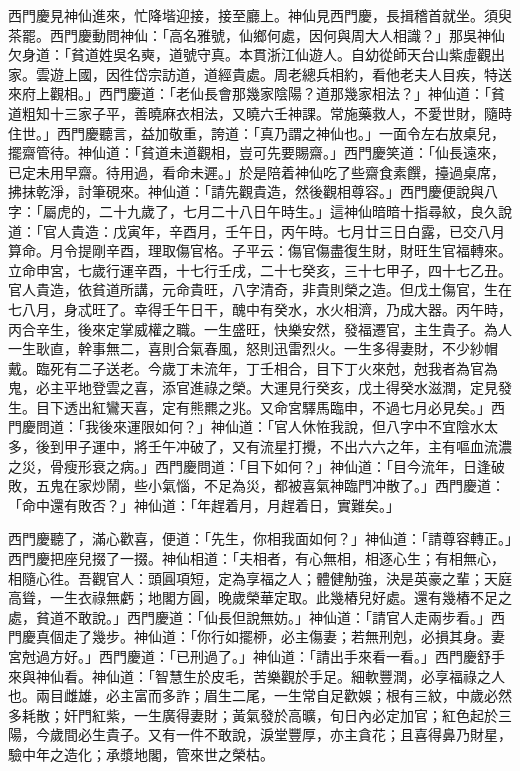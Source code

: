 西門慶見神仙進來，忙降堦迎接，接至廳上。神仙見西門慶，長揖稽首就坐。須臾茶罷。西門慶動問神仙：「高名雅號，仙鄉何處，因何與周大人相識？」那吳神仙欠身道：「貧道姓吳名奭，道號守真。本貫浙江仙遊人。自幼從師天台山紫虛觀出家。雲遊上國，因徃岱宗訪道，道經貴處。周老總兵相約，看他老夫人目疾，特送來府上觀相。」西門慶道：「老仙長會那幾家陰陽？道那幾家相法？」神仙道：「貧道粗知十三家子平，善曉麻衣相法，又曉六壬神課。常施藥救人，不愛世財，隨時住世。」西門慶聽言，益加敬重，誇道：「真乃謂之神仙也。」一面令左右放桌兒，擺齋管待。神仙道：「貧道未道觀相，豈可先要賜齋。」西門慶笑道：「仙長遠來，已定未用早齋。待用過，看命未遲。」於是陪着神仙吃了些齋食素饌，擡過桌席，拂抹乾淨，討筆硯來。神仙道：「請先觀貴造，然後觀相尊容。」{}西門慶便說與八字：「屬虎的，二十九歲了，七月二十八日午時生。」這神仙暗暗十指尋紋，良久說道：「官人貴造：戊寅年，辛酉月，壬午日，丙午時。七月廿三日白露，已交八月算命。月令提剛辛酉，理取傷官格。子平云：傷官傷盡復生財，財旺生官福轉來。立命申宮，七歲行運辛酉，十七行壬戌，二十七癸亥，三十七甲子，四十七乙丑。官人貴造，依貧道所講，元命貴旺，八字清奇，非貴則榮之造。但戊土傷官，生在七八月，身忒旺了。幸得壬午日干，醜中有癸水，水火相濟，乃成大器。丙午時，丙合辛生，後來定掌威權之職。一生盛旺，快樂安然，發福遷官，主生貴子。為人一生耿直，幹事無二，喜則合氣春風，怒則迅雷烈火。一生多得妻財，不少紗帽戴。{}臨死有二子送老。今歲丁未流年，丁壬相合，目下丁火來尅，尅我者為官為鬼，必主平地登雲之喜，添官進祿之榮。大運見行癸亥，戊土得癸水滋潤，定見發生。目下透出紅鸞天喜，定有熊羆之兆。又命宮驛馬臨申，不過七月必見矣。」西門慶問道：「我後來運限如何？」神仙道：「官人休恠我說，但八字中不宜陰水太多，後到甲子運中，將壬午冲破了，又有流星打攪，不出六六之年，主有嘔血流濃之災，骨瘦形衰之病。」西門慶問道：「目下如何？」神仙道：「目今流年，日逢破敗，五鬼在家炒鬧，些小氣惱，不足為災，都被喜氣神臨門冲散了。」西門慶道：「命中還有敗否？」神仙道：「年趕着月，月趕着日，實難矣。」

西門慶聽了，滿心歡喜，便道：「先生，你相我面如何？」神仙道：「請尊容轉正。」西門慶把座兒掇了一掇。神仙相道：「夫相者，有心無相，相逐心生；有相無心，相隨心徃。吾觀官人：頭圓項短，定為享福之人；體健觔強，決是英豪之輩；天庭高聳，一生衣祿無虧；地閣方圓，晚歲榮華定取。此幾樁兒好處。還有幾樁不足之處，貧道不敢說。」西門慶道：「仙長但說無妨。」神仙道：「請官人走兩步看。」西門慶真個走了幾步。神仙道：「你行如擺桺，必主傷妻；若無刑剋，必損其身。妻宮尅過方好。」西門慶道：「已刑過了。」神仙道：「請出手來看一看。」西門慶舒手來與神仙看。神仙道：「智慧生於皮毛，苦樂觀於手足。細軟豐潤，必享福祿之人也。兩目雌雄，必主富而多詐；眉生二尾，一生常自足歡娛；根有三紋，中歲必然多耗散；奸門紅紫，一生廣得妻財；黃氣發於高曠，旬日內必定加官；紅色起於三陽，今歲間必生貴子。又有一件不敢說，淚堂豐厚，亦主貪花；且喜得鼻乃財星，驗中年之造化；承漿地閣，管來世之榮枯。

